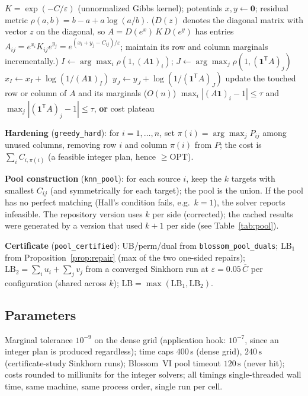 \documentclass[11pt]{article}
\theoremstyle{remark}
\begin{document}
\begin{algorithm}[h]
\caption{Greenkhorn (after \cite[Alg.~4]{awr2017})}\label{alg:green}
\begin{algorithmic}[1]
\Require $K=\exp(-C/\varepsilon)$ (unnormalized Gibbs kernel); potentials
  $x,y\leftarrow \mathbf{0}$; residual metric $\rho(a,b)=b-a+a\log(a/b)$.
  ($D(z)$ denotes the diagonal matrix with vector $z$ on the diagonal, so
  $A=D(e^x)\,K\,D(e^y)$ has entries
  $A_{ij}=e^{x_i}K_{ij}e^{y_j}=e^{(x_i+y_j-C_{ij})/\varepsilon}$;
  maintain its row and column marginals incrementally.)
\Repeat
  \State $I\leftarrow\arg\max_i \rho(1,(A\mathbf 1)_i)$;
         $J\leftarrow\arg\max_j \rho(1,(\mathbf 1^{\mathsf T}A)_j)$
    \State $x_I\leftarrow x_I+\log(1/(A\mathbf 1)_I)$
  \Else
    \State $y_J\leftarrow y_J+\log(1/(\mathbf 1^{\mathsf T}A)_J)$
  \EndIf
  \State update the touched row or column of $A$ and its marginals ($O(n)$)
\Until $\max_i|(A\mathbf 1)_i-1|\le\tau$ and
       $\max_j|(\mathbf 1^{\mathsf T}A)_j-1|\le\tau$, \textbf{or} cost plateau
\end{algorithmic}
\end{algorithm}

\textbf{Hardening} (\texttt{greedy\_hard}): for $i=1,\dots,n$, set
$\pi(i)=\arg\max_j P_{ij}$ among unused columns, removing row $i$ and
column $\pi(i)$ from $P$; the cost is $\sum_i C_{i,\pi(i)}$ (a feasible
integer plan, hence $\ge \mathrm{OPT}$).

\textbf{Pool construction} (\texttt{knn\_pool}): for each source $i$, keep
the $k$ targets with smallest $C_{ij}$ (and symmetrically for each target);
the pool is the union. If the pool has no perfect matching (Hall's
condition fails, e.g.\ $k=1$), the solver reports infeasible. The
repository version uses $k$ per side (corrected); the cached results were
generated by a version that used $k+1$ per side (see Table~\ref{tab:pool}).

\textbf{Certificate} (\texttt{pool\_certified}):
UB/perm/dual from \texttt{blossom\_pool\_duals};
$\mathrm{LB}_1$ from Proposition~\ref{prop:repair} (max of the two
one-sided repairs); $\mathrm{LB}_2=\sum_i u_i+\sum_j v_j$ from a converged
Sinkhorn run at $\varepsilon=0.05\,\overline C$ per configuration (shared
across $k$); $\mathrm{LB}=\max(\mathrm{LB}_1,\mathrm{LB}_2)$.

\subsection{Parameters}
Marginal tolerance $10^{-9}$ on the dense grid (application hook: $10^{-7}$,
since an integer plan is produced regardless); time caps $400\,$s (dense
grid), $240\,\mathrm{s}$ (certificate-study Sinkhorn runs); Blossom~VI pool
timeout $120\,\mathrm{s}$ (never hit); costs rounded to milliunits for the
integer solvers; all timings single-threaded wall time, same machine, same
process order, single run per cell.
\end{document}
